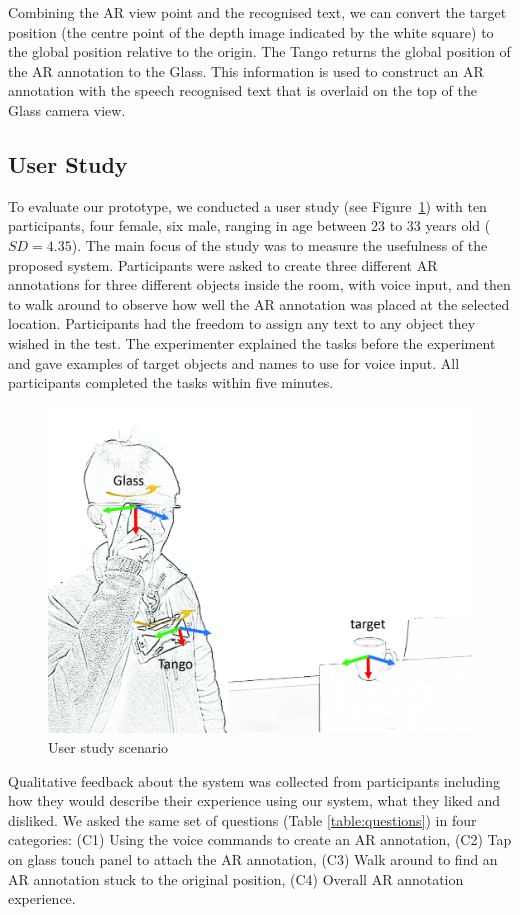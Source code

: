 Combining the AR view point and the recognised text, we can convert the target position (the centre point of the depth image indicated by the white square) to the global position relative to the origin. The Tango returns the global position of the AR annotation to the Glass. This information is used to construct an AR annotation with the speech recognised text that is overlaid on the top of the Glass camera view.

\subsection{User Study}

To evaluate our prototype, we conducted a user study (see Figure~\ref{fig:mgia15:scenario}) with ten participants, four female, six male, ranging in age between 23 to 33 years old ($SD= 4.35$). The main focus of the study was to measure the usefulness of the proposed system. Participants were asked to create three different AR annotations for three different objects inside the room, with voice input, and then to walk around to observe how well the AR annotation was placed at the selected location. Participants had the freedom to assign any text to any object they wished in the test. The experimenter explained the tasks before the experiment and gave examples of target objects and names to use for voice input. All participants completed the tasks within five minutes. 

\begin{figure}[ht]
  \centering
  \includegraphics[width=.8\linewidth]{images/mgia15/axis_lo.jpg}
  \caption{User study scenario}
  \label{fig:mgia15:scenario}
\end{figure}

Qualitative feedback about the system was collected from participants including how they would describe their experience using our system, what they liked and disliked. We asked the same set of questions (Table \ref{table:questions}) in four categories: (C1) Using the voice commands to create an AR annotation, (C2) Tap on glass touch panel to attach the AR annotation, (C3)  Walk around to find an AR annotation stuck to the original position, (C4) Overall AR annotation experience.

